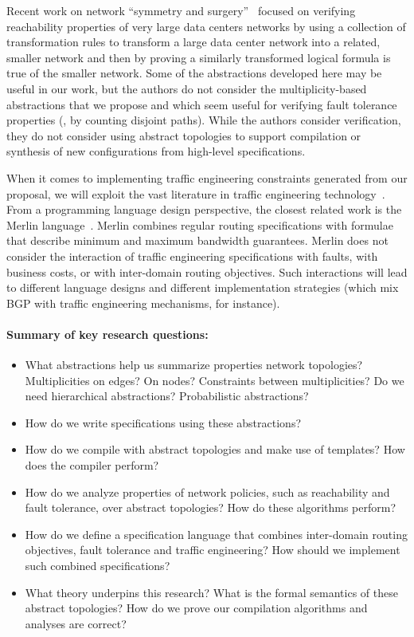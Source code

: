 Recent work on network ``symmetry and surgery''~\cite{bjorner+:scaling-network-verification} focused on verifying reachability properties of very large
data centers networks by using a collection of transformation rules to 
transform a large data center network into
a related, smaller network and then by proving a similarly transformed
logical formula is true of the smaller network.  Some of the abstractions
developed here may be useful in our work, but the authors do not consider
the multiplicity-based abstractions that we propose and which seem useful
for verifying fault tolerance properties (\eg, by counting disjoint paths).
While the authors consider verification, they do not consider using
abstract topologies to support compilation or synthesis
of new configurations from high-level specifications.

When it comes to implementing traffic engineering constraints generated from
our proposal, we will exploit
the vast literature in traffic engineering technology~\cite{?,?}.  From a programming language
design perspective, the closest related work is the Merlin language~\cite{foster:merlin}.  Merlin
combines regular routing specifications with formulae that describe minimum and maximum
bandwidth guarantees.  Merlin does not consider the interaction of traffic engineering
specifications with faults, with business costs, or with inter-domain routing objectives.  
Such interactions will lead to different language designs and different implementation
strategies (which mix BGP with traffic engineering mechanisms, for instance).

\paragraph*{Summary of key research questions:}

\begin{itemize}
\item What abstractions help us summarize properties network topologies?
Multiplicities on edges?  On nodes?  Constraints between multiplicities?
Do we need hierarchical abstractions?  Probabilistic abstractions? 
\item How do we write \Name specifications using these abstractions?
\item How do we compile with abstract topologies and make use of templates?  
 How does the compiler perform?
\item How do we analyze properties of network policies, such as
reachability and fault tolerance, over abstract
topologies?  How do these algorithms perform?
\item How do we define a specification language that combines inter-domain
routing objectives, fault tolerance and traffic engineering?  How
should we implement such combined specifications?
\item What theory underpins this research?  What is the formal 
semantics of these abstract topologies?  How do we prove our
compilation algorithms and analyses are correct?
\end{itemize}

